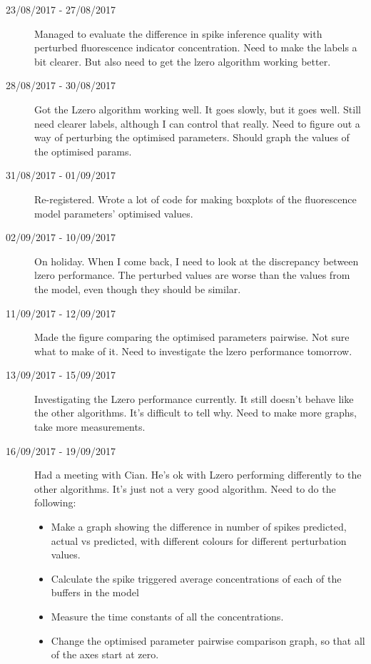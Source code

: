 \documentclass[a4paper,12pt]{article}
\theoremstyle{definition}
\begin{document}
\begin{description}
	\item[23/08/2017 - 27/08/2017] Managed to evaluate the difference in spike inference quality with perturbed fluorescence indicator concentration. Need to make the labels a bit clearer. But also need to get the lzero algorithm working better.

	\item[28/08/2017 - 30/08/2017] Got the Lzero algorithm working well. It goes slowly, but it goes well. Still need clearer labels, although I can control that really. Need to figure out a way of perturbing the optimised parameters. Should graph the values of the optimised params.

	\item[31/08/2017 - 01/09/2017] Re-registered. Wrote a lot of code for making boxplots of the fluorescence model parameters' optimised values.

	\item[02/09/2017 - 10/09/2017] On holiday. When I come back, I need to look at the discrepancy between lzero performance. The perturbed values are worse than the values from the model, even though they should be similar.

	\item[11/09/2017 - 12/09/2017] Made the figure comparing the optimised parameters pairwise. Not sure what to make of it. Need to investigate the lzero performance tomorrow.

	\item[13/09/2017 - 15/09/2017] Investigating the Lzero performance currently. It still doesn't behave like the other algorithms. It's difficult to tell why. Need to make more graphs, take more measurements.

	\item[16/09/2017 - 19/09/2017] Had a meeting with Cian. He's ok with Lzero performing differently to the other algorithms. It's just not a very good algorithm. Need to do the following:
	\begin{itemize}
		\item Make a graph showing the difference in number of spikes predicted, actual vs predicted, with different colours for different perturbation values.
		\item Calculate the spike triggered average concentrations of each of the buffers in the model
		\item Measure the time constants of all the concentrations.
		\item Change the optimised parameter pairwise comparison graph, so that all of the axes start at zero.
	\end{itemize}


\end{description}
\end{document}
